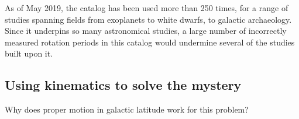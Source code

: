 \documentclass[useAMS, usenatbib, preprint, 12pt]{aastex}
\begin{document}
As of May 2019, the \citet{mcquillan2014} catalog has been used more than 250
times, for a range of studies spanning fields from exoplanets to white dwarfs,
to galactic archaeology.
Since it underpins so many astronomical studies, a large number of incorrectly
measured rotation periods in this catalog would undermine several of the
studies built upon it.

\subsection{Using kinematics to solve the mystery}

Why does proper motion in galactic latitude work for this problem?



\end{document}
